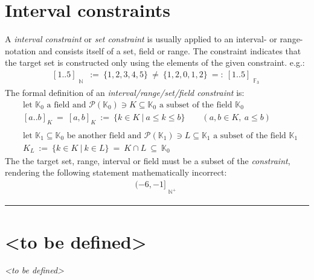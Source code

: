 \documentclass[pdftex,12pt,a4paper]{report}
\begin{document}
    \section{Interval constraints}
    A \emph{interval constraint} or \emph{set constraint} is usually applied to an interval- or range-notation and consists itself of a set, field or range. The constraint indicates that the target set is constructed only using the elements of the given constraint. e.g.:
    \begin{equation*}
        \begin{aligned}
            [1..5]_{\substack{\text{} \\ \mathbb{N}}} \ := \ \{1,2,3,4,5\} \ \neq \ \{1,2,0,1,2\} \ =: \ [1..5]_{\substack{\text{} \\ \mathbb{F}_3}}
        \end{aligned}
    \end{equation*}
    The formal definition of an \emph{interval/range/set/field constraint} is:
    \begin{equation*}
        \begin{aligned}
            & \text{let } \mathbb{K}_0 \text{ a field and } \mathcal{P}(\mathbb{K}_0) \ni K \subseteq \mathbb{K}_0 \text{ a subset of the field } \mathbb{K}_0
            \\
            & [a..b]_K \ = \ [a,b]_K \ := \ \{k \in K \ |\ a \leq k \leq b\} \qquad (a,b \in K, \ a \leq b)
            \\
            \\
            & \text{let } \mathbb{K}_1 \subseteq \mathbb{K}_0 \text{ be another field and } \mathcal{P}(\mathbb{K}_1) \ni L \subseteq \mathbb{K}_1 \text{ a subset of the field } \mathbb{K}_1
            \\
            & K_L \ := \ \{k \in K \ |\ k \in L\}\ = \ K \cap L \ \subseteq \ \mathbb{K}_0
        \end{aligned}
    \end{equation*}
    The the target set, range, interval or field must be a subset of the \emph{constraint}, rendering the following statement mathematically incorrect:
    \begin{equation*}
        \begin{aligned}
            (-6,-1]_{\substack{\text{} \\ \mathbb{N^+}}}
        \end{aligned}
    \end{equation*}
    \vspace{5mm} \hrule
    \section{<to be defined>}
    \textsl{<to be defined>}
\end{document}
